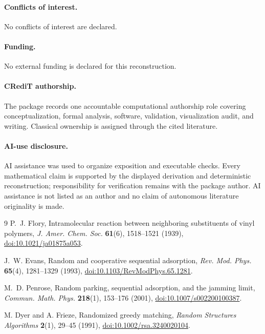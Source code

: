 \documentclass[10pt]{article}
\begin{document}
\paragraph{Conflicts of interest.}
No conflicts of interest are declared.

\paragraph{Funding.}
No external funding is declared for this reconstruction.

\paragraph{CRediT authorship.}
The package records one accountable computational authorship role covering
conceptualization, formal analysis, software, validation, visualization audit,
and writing.  Classical ownership is assigned through the cited literature.

\paragraph{AI-use disclosure.}
AI assistance was used to organize exposition and executable checks.  Every
mathematical claim is supported by the displayed derivation and deterministic
reconstruction; responsibility for verification remains with the package
author.  AI assistance is not listed as an author and no claim of autonomous
literature originality is made.
\fi

\begin{thebibliography}{9}
P.~J. Flory,
\newblock Intramolecular reaction between neighboring substituents of vinyl
polymers,
\newblock \emph{J. Amer. Chem. Soc.} \textbf{61}(6), 1518--1521 (1939),
\href{https://doi.org/10.1021/ja01875a053}{doi:10.1021/ja01875a053}.

J.~W. Evans,
\newblock Random and cooperative sequential adsorption,
\newblock \emph{Rev. Mod. Phys.} \textbf{65}(4), 1281--1329 (1993),
\href{https://doi.org/10.1103/RevModPhys.65.1281}{doi:10.1103/RevModPhys.65.1281}.

M.~D. Penrose,
\newblock Random parking, sequential adsorption, and the jamming limit,
\newblock \emph{Commun. Math. Phys.} \textbf{218}(1), 153--176 (2001),
\href{https://doi.org/10.1007/s002200100387}{doi:10.1007/s002200100387}.

M. Dyer and A. Frieze,
\newblock Randomized greedy matching,
\newblock \emph{Random Structures Algorithms} \textbf{2}(1), 29--45 (1991),
\href{https://doi.org/10.1002/rsa.3240020104}{doi:10.1002/rsa.3240020104}.
\end{thebibliography}
\end{document}
